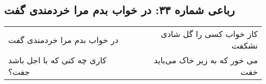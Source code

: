 \begin{center}
\section*{رباعی شماره ۳۳: در خواب بدم مرا خردمندی گفت}
\label{sec:sh033}
\begin{longtable}{l p{0.5cm} r}
در خواب بدم مرا خردمندی گفت
&&
کاز خواب کسی را گل شادی نشکفت
\\
کاری چه کنی که با اجل باشد جفت؟
&&
می خور که به زیر خاک می‌باید خفت
\\
\end{longtable}
\end{center}
